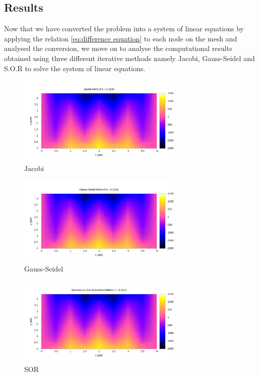 \subsection{Results}
Now that we have converted the problem into a system of linear equations by applying the relation \ref{eq:difference equation} to each node on the mesh and analysed the conversion, we move on to analyse the computational results obtained using three different iterative methods namely Jacobi, Gauss-Seidel and S.O.R to solve the system of linear equations.
\newpage

\begin{figure}[H]
    \centering
    \includegraphics[width= 0.7\textwidth]{content/graphs/Jacobi_0125_map.png}
    \caption{Jacobi}
    \label{fig1}
\end{figure}%

\begin{figure}[H]
    \centering
    \includegraphics[width= 0.7\textwidth]{content/graphs/gauss_map.png}
    \caption{Gauss-Seidel}
    \label{fig2:}
\end{figure}%

\begin{figure}[H]
    \centering
    \includegraphics[width= 0.7\textwidth]{content/graphs/sor_map.png}
    \caption{SOR}
    \label{fig3:}
\end{figure}%
\newpage 
